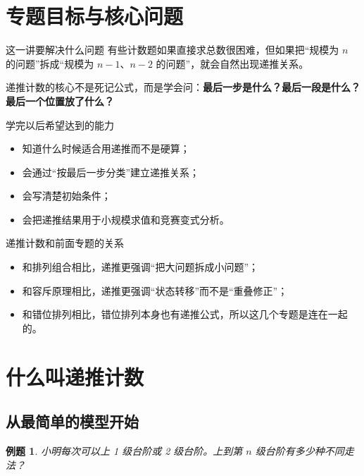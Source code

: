 \documentclass[11pt,a4paper,fontset=fandol]{ctexart}
\theoremstyle{formaltheorem}
\theoremstyle{formalexample}
\newtheorem{example}{例题}[section]
\begin{document}
\pagestyle{plain}
\tableofcontents
\newpage
\pagestyle{fancy}

\section{专题目标与核心问题}

\begin{goalbox}{这一讲要解决什么问题}
有些计数题如果直接求总数很困难，但如果把“规模为 $n$ 的问题”拆成“规模为 $n-1$、$n-2$ 的问题”，就会自然出现递推关系。

递推计数的核心不是死记公式，而是学会问：\textbf{最后一步是什么？最后一段是什么？最后一个位置放了什么？}
\end{goalbox}

\begin{goalbox}{学完以后希望达到的能力}
\begin{itemize}
  \item 知道什么时候适合用递推而不是硬算；
  \item 会通过“按最后一步分类”建立递推关系；
  \item 会写清楚初始条件；
  \item 会把递推结果用于小规模求值和竞赛变式分析。
\end{itemize}
\end{goalbox}

\begin{notebox}{递推计数和前面专题的关系}
\begin{itemize}
  \item 和排列组合相比，递推更强调“把大问题拆成小问题”；
  \item 和容斥原理相比，递推更强调“状态转移”而不是“重叠修正”；
  \item 和错位排列相比，错位排列本身也有递推公式，所以这几个专题是连在一起的。
\end{itemize}
\end{notebox}

\section{什么叫递推计数}

\subsection{从最简单的模型开始}

\begin{example}
小明每次可以上 1 级台阶或 2 级台阶。上到第 $n$ 级台阶有多少种不同走法？
\end{example}
\end{document}

